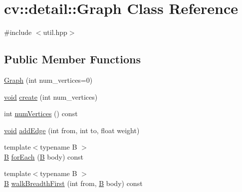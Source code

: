 \hypertarget{classcv_1_1detail_1_1Graph}{\section{cv\-:\-:detail\-:\-:Graph Class Reference}
\label{classcv_1_1detail_1_1Graph}
}


{\ttfamily \#include $<$util.\-hpp$>$}

\subsection*{Public Member Functions}
\begin{DoxyCompactItemize}
\item 
\hyperlink{classcv_1_1detail_1_1Graph_a28af321e16d2ff278f0ee8ca5ff93eb9}{Graph} (int num\-\_\-vertices=0)
\item 
\hyperlink{legacy_8hpp_a8bb47f092d473522721002c86c13b94e}{void} \hyperlink{classcv_1_1detail_1_1Graph_a36812f283b56ba6cbeec3cf3c3db3883}{create} (int num\-\_\-vertices)
\item 
int \hyperlink{classcv_1_1detail_1_1Graph_a827bc6bca48d093a74a5365a668d7538}{num\-Vertices} () const 
\item 
\hyperlink{legacy_8hpp_a8bb47f092d473522721002c86c13b94e}{void} \hyperlink{classcv_1_1detail_1_1Graph_ab71aed62d6713b3dc9c2833a42686fdc}{add\-Edge} (int from, int to, float weight)
\item 
{\footnotesize template$<$typename B $>$ }\\\hyperlink{tracking_8hpp_abfbb8a90031c2fb62897dafb4d390f6d}{B} \hyperlink{classcv_1_1detail_1_1Graph_ade420987c620b6628d7ba4bdfd3d3ced}{for\-Each} (\hyperlink{tracking_8hpp_abfbb8a90031c2fb62897dafb4d390f6d}{B} body) const 
\item 
{\footnotesize template$<$typename B $>$ }\\\hyperlink{tracking_8hpp_abfbb8a90031c2fb62897dafb4d390f6d}{B} \hyperlink{classcv_1_1detail_1_1Graph_a7e8491f24e0de433fd196c26e01ca361}{walk\-Breadth\-First} (int from, \hyperlink{tracking_8hpp_abfbb8a90031c2fb62897dafb4d390f6d}{B} body) const 
\end{DoxyCompactItemize}


